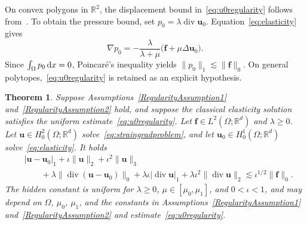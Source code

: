 \documentclass[10pt]{amsart}
\newtheorem{theorem}{Theorem}[section]
\newcommand{\dx}{\,{\rm d}x}
\renewcommand{\div}{\operatorname{div}}
\numberwithin{equation}{section}
\begin{document}
On convex polygons in $\mathbb R^2$, the displacement bound in~\eqref{eq:u0regularity} follows from~\cite[Theorem~3.1]{BacutaBramble2003}. To obtain the pressure bound, set $p_0=\lambda\div\boldsymbol u_0$. Equation~\eqref{eq:elasticity} gives
\[
\nabla p_0=-\frac{\lambda}{\lambda+\mu}\big(\boldsymbol f+\mu\Delta\boldsymbol u_0\big).
\]
Since $\int_\Omega p_0\dx=0$, Poincar\'e's inequality yields $\|p_0\|_1\lesssim\|\boldsymbol f\|_0$. On general polytopes,~\eqref{eq:u0regularity} is retained as an explicit hypothesis.

\begin{theorem}\label{tm:upregularity}
Suppose Assumptions~\ref{RegularityAssumption1} and~\ref{RegularityAssumption2} hold, and suppose the classical elasticity solution satisfies the uniform estimate~\eqref{eq:u0regularity}.
Let $\boldsymbol f\in L^2(\Omega;\mathbb R^d)$ and $\lambda\ge0$. Let $\boldsymbol u\in H_0^2(\Omega; \mathbb R^d)$ solve~\eqref{eq:straingradproblem}, and let $\boldsymbol u_0\in H_0^1(\Omega; \mathbb R^d)$ solve~\eqref{eq:elasticity}. It holds
\begin{equation}\label{eq:straingradregularity}	
\begin{aligned}	
&|\boldsymbol u-\boldsymbol u_0|_{1} +\iota\|\boldsymbol u\|_2  + \iota^{2}\|\boldsymbol u\|_{3}\\
&\qquad+\lambda\|\div(\boldsymbol u-\boldsymbol u_0)\|_0 + \lambda\iota|\div\boldsymbol u|_1 + \lambda\iota^2\|\div\boldsymbol u\|_2 \lesssim \iota^{1/2}\|\boldsymbol f\|_0.
\end{aligned}
\end{equation}
The hidden constant is uniform for \(\lambda\ge0\), \(\mu\in[\mu_0,\mu_1]\), and \(0<\iota<1\), and may depend on \(\Omega\), \(\mu_0\), \(\mu_1\), and the constants in Assumptions~\ref{RegularityAssumption1} and~\ref{RegularityAssumption2} and estimate~\eqref{eq:u0regularity}.
\end{theorem}
\end{document}

